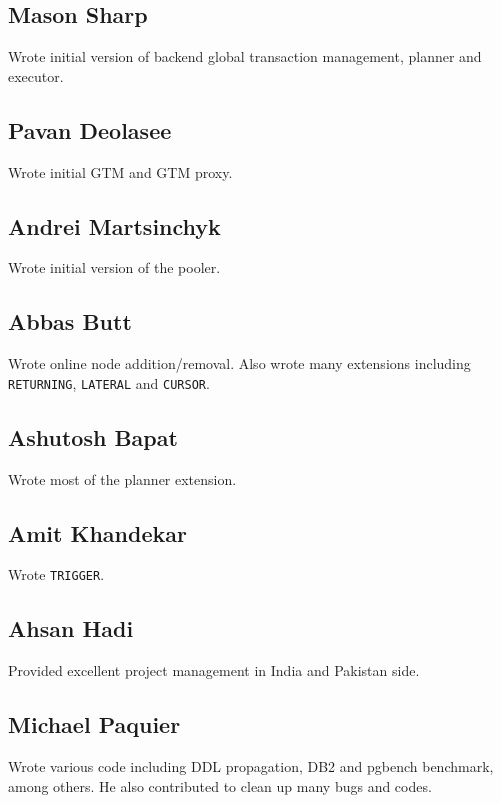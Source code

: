 \documentclass[10pt,a4paper]{book}
\begin{document}
\subsection*{Mason Sharp}

Wrote initial version of backend global transaction management, planner and executor.

\subsection*{Pavan Deolasee}

Wrote initial GTM and GTM proxy.

\subsection*{Andrei Martsinchyk}

Wrote initial version of the pooler.

\subsection*{Abbas Butt}

Wrote online node addition/removal.
Also wrote many extensions including \texttt{RETURNING}, \texttt{LATERAL} and \texttt{CURSOR}.

\subsection*{Ashutosh Bapat}

Wrote most of the planner extension.

\subsection*{Amit Khandekar}

Wrote \texttt{TRIGGER}.

\subsection*{Ahsan Hadi}

Provided excellent project management in India and Pakistan side.

\subsection*{Michael Paquier}

Wrote various code including DDL propagation, DB2 and pgbench benchmark, among others.
He also contributed to clean up many bugs and codes.
\end{document}
